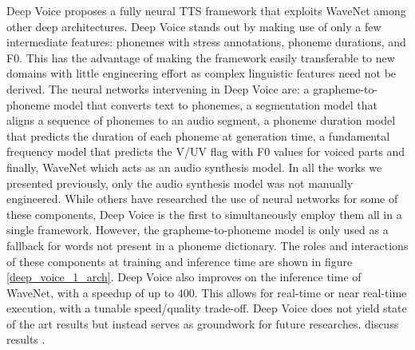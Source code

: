 \documentclass[a4paper, oneside, 12pt, english]{article}
\begin{document}


Deep Voice \citep{DeepVoice1} proposes a fully neural TTS framework that exploits WaveNet among other deep architectures. Deep Voice stands out by making use of only a few intermediate features: phonemes with stress annotations, phoneme durations,
and F0. This has the advantage of making the framework easily transferable to new domains with little engineering effort as complex linguistic features need not be derived. The neural networks intervening in Deep Voice are: a grapheme-to-phoneme model that converts text to phonemes, a segmentation model that aligns a sequence of phonemes to an audio segment, a phoneme duration model that predicts the duration of each phoneme at generation time, a fundamental frequency model that predicts the V/UV flag with F0 values for voiced parts and finally, WaveNet which acts as an audio synthesis model. In all the works we presented previously, only the audio synthesis model was not manually engineered. While others have researched the use of neural networks for some of these components, Deep Voice is the first to simultaneously employ them all in a single framework. However, the grapheme-to-phoneme model is only used as a fallback for words not present in a phoneme dictionary. The roles and interactions of these components at training and inference time are shown in figure \ref{deep_voice_1_arch}. Deep Voice also improves on the inference time of WaveNet, with a speedup of up to 400. This allows for real-time or near real-time execution, with a tunable speed/quality trade-off. Deep Voice does not yield state of the art results but instead serves as groundwork for future researches. \color{red} discuss results \color{black}.
\end{document}
